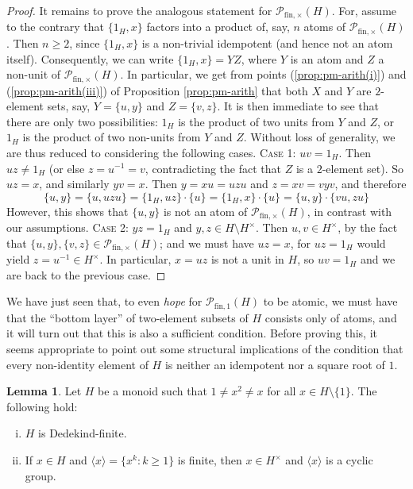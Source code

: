 \documentclass{report}
\renewcommand{\P}{\mathcal{P}}
\newcommand{\gen}[1]{\langle #1 \rangle}
\newcommand{\fin}{\textrm{fin}}
\newcommand{\funt}{{\textrm{fin}, \times}}
\newcommand{\fun}{{\textrm{fin}, 1}}
\renewcommand{\:}{\text{:}}
\theoremstyle{definition}
\newtheorem{lemma}[defn]{Lemma}
\begin{document}
\begin{proof}
It remains to prove the analogous statement for $\mathcal P_{\fin,\times}(H)$.
For, assume to the contrary that $\{1_H,x\}$ factors into a product of, say, $n$ atoms of $\mathcal P_{\fin,\times}(H)$. Then $n \ge 2$, since $\{1_H, x\}$ is a non-trivial idempotent (and hence not an atom itself). Consequently, we can write $\{1_H,x\} = YZ$, where $Y$ is an atom and $Z$ a non-unit of $\mathcal P_{\fin,\times}(H)$. In particular, we get from points (\ref{prop:pm-arith(i)}) and (\ref{prop:pm-arith(iii)}) of Proposition \ref{prop:pm-arith} that both $X$ and $Y$ are $2$-element sets, say, $Y = \{u, y\}$ and $Z = \{v, z\}$. It is then immediate to see that there are only two possibilities: $1_H$ is the product of two units from $Y$ and $Z$, or $1_H$ is the product of two non-units from $Y$ and $Z$.
Without loss of generality, we are thus reduced to considering the following cases.
\vskip 0.1cm
\textsc{Case 1:} $uv=1_H$. Then $uz \ne 1_H$ (or else $z = u^{-1} = v$, contradicting the fact that $Z$ is a $2$-element set). So $uz=x$, and similarly $yv=x$. Then $y = xu = uzu$ and $z = xv = vyv$, and therefore
$$
\{u,y\} = \{u,uzu\} = \{1_H,uz\}\cdot \{u\} = \{1_H,x\}\cdot\{u\} = \{u,y\}\cdot \{vu,zu\}
$$
However, this shows that $\{u,y\}$ is not an atom of $\P_\funt(H)$, in contrast with our assumptions.
\vskip 0.1cm
\textsc{Case 2:}
$yz = 1_H$ and $y,z\in H\setminus H^\times$. Then $u,v\in H^\times$, by the fact that $\{u, y\}, \{v, z\} \in \mathcal P_{\fin,\times}(H)$; and we must have $uz=x$, for $uz=1_H$ would yield $z = u^{-1}\in H^\times$.
In particular, $x = uz$ is not a unit in $H$, so $uv=1_H$ and we are back to the previous case.
\end{proof}
%
We have just seen that, to even {\it hope} for $\P_\fun(H)$ to be atomic, we must have that the ``bottom layer'' of two-element subsets of $H$ consists only of atoms, and it will turn out that this is also a sufficient condition.
Before proving this, it seems appropriate to point out some structural implications of the condition that every non-identity element of $H$ is neither an idempotent nor a square root of $1$.
%
\begin{lemma}\label{prop:no-non-id-elts-of-small-order-implies-structure}
Let $H$ be a monoid such that $1 \ne x^2 \ne x$ for all $x\in H\setminus\{1\}$. The following hold:
%
\begin{enumerate}[(i)]
\item\label{prop:no-non-id-elts-of-small-order-implies-structure(i)}
	$H$ is Dedekind-finite.
\item\label{prop:no-non-id-elts-of-small-order-implies-structure(ii)}
	If $x \in H$ and $\gen{x} = \{x^k : k\ge 1 \}$ is finite, then $x \in H^\times$ and $\gen{x}$ is a cyclic group.
\end{enumerate}
\end{lemma}
\end{document}
